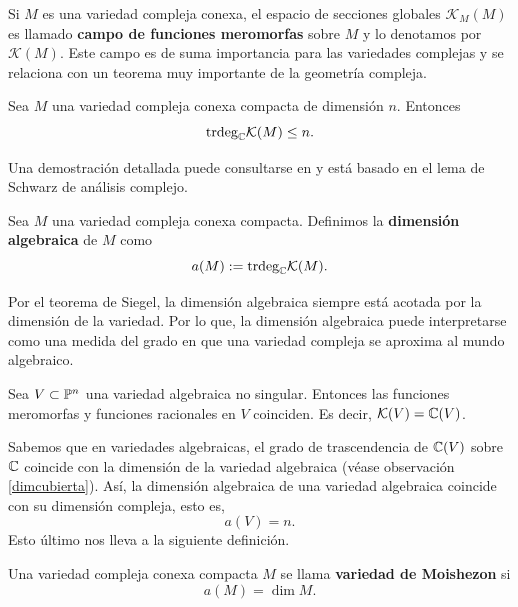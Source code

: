 Si $M$ es una variedad compleja conexa, el espacio de secciones globales $\mathcal{K}_{M}(M)$ es llamado \textbf{campo de funciones meromorfas} sobre $M$ y lo denotamos por $\mathcal{K}(M)$. Este campo es de suma importancia para las variedades complejas y se relaciona con un teorema muy importante de la geometría compleja.

\begin{theorem}[Siegel]
	Sea $M$ una variedad compleja conexa compacta de dimensión $n$. Entonces
	\begin{equation*}
		\mathrm{trdeg}_{\mathbb{C}}\mathcal{K}(M)\leq n.
	\end{equation*}
\end{theorem}
Una demostración detallada puede consultarse en \parencite[Teo. 4.23]{carlosga} y está basado en el lema de Schwarz de análisis complejo.

\begin{definition}
	Sea $M$ una variedad compleja conexa compacta. Definimos la \textbf{dimensión algebraica} de $M$ como
	\begin{equation*}
		a(M):=\mathrm{trdeg}_{\mathbb{C}}\mathcal{K}(M).
	\end{equation*}
\end{definition}

Por el teorema de Siegel, la dimensión algebraica siempre está acotada por la dimensión de la variedad. Por lo que, la dimensión algebraica puede interpretarse como una medida del grado en que una variedad compleja se aproxima al mundo algebraico.

\begin{theorem}\parencite[Chap. VIII, Sec. 3.1, Theo. 1]{shafarevich2016basic}
	Sea $V\subset \mathbb{P}^n$ una variedad algebraica no singular. Entonces las funciones meromorfas y funciones racionales en $V$ coinciden. Es decir, $\mathcal{K}(V)=\mathbb{C}(V)$.
\end{theorem}

Sabemos que en variedades algebraicas, el grado de trascendencia de $\mathbb{C}(V)$ sobre $\mathbb{C}$ coincide con la dimensión de la variedad algebraica (véase observación \ref{dimcubierta}). Así, la dimensión algebraica de una variedad algebraica coincide con su dimensión compleja, esto es,
\begin{equation*}
	a(V)=n.
\end{equation*}
Esto último nos lleva a la siguiente definición.

\begin{definition}
	Una variedad compleja conexa compacta $M$ se llama \textbf{variedad de Moishezon} si
	\begin{equation*}
		a(M)=\dim M.
	\end{equation*}
\end{definition}

